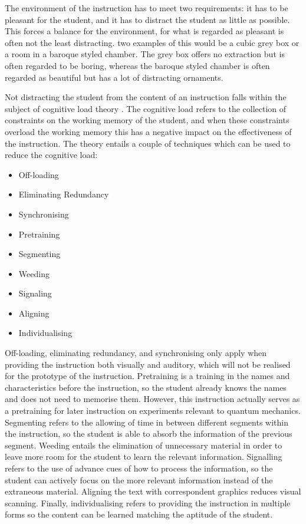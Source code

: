 \documentclass[11pt,twoside]{report} %
\begin{document}
The environment of the instruction has to meet two requirements: it has to be pleasant for the student, and it has to distract the student as little as possible. This forces a balance for the environment, for what is regarded as pleasant is often not the least distracting. two examples of this would be a cubic grey box or a room in a baroque styled chamber. The grey box offers no extraction but is often regarded to be boring, whereas the baroque styled chamber is often regarded as beautiful but has a lot of distracting ornaments.

Not distracting the student from the content of an instruction falls within the subject of cognitive load theory \cite{smithragan}. The cognitive load refers to the collection of constraints on the working memory of the student, and when these constraints overload the working memory this has a negative impact on the effectiveness of the instruction. The theory entails a couple of techniques which can be used to reduce the cognitive load:

\begin{itemize}
	\item Off-loading
	\item Eliminating Redundancy
	\item Synchronising
	\item Pretraining
	\item Segmenting
	\item Weeding
	\item Signaling
	\item Aligning
	\item Individualising
\end{itemize}

Off-loading, eliminating redundancy, and synchronising only apply when providing the instruction both visually and auditory, which will not be realised for the prototype of the instruction. Pretraining is a training in the names and characteristics before the instruction, so the student already knows the names and does not need to memorise them. However, this instruction actually serves as a pretraining for later instruction on experiments relevant to quantum mechanics. Segmenting refers to the allowing of time in between different segments within the instruction, so the student is able to absorb the information of the previous segment. Weeding entails the elimination of unnecessary material in order to leave more room for the student to learn the relevant information. Signalling refers to the use of advance cues of how to process the information, so the student can actively focus on the more relevant information instead of the extraneous material. Aligning the text with correspondent graphics reduces visual scanning. Finally, individualising refers to providing the instruction in multiple forms so the content can be learned matching the aptitude of the student.
\end{document}
